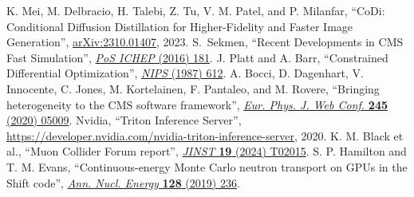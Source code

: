 \begin{thebibliography}{99}
 K. Mei, M. Delbracio, H. Talebi, Z. Tu, V. M. Patel, and P. Milanfar, ``CoDi: Conditional Diffusion Distillation for Higher-Fidelity and Faster Image Generation'', \href{https://arxiv.org/abs/2310.01407}{arXiv:2310.01407}, 2023.
 S.~Sekmen, ``Recent Developments in CMS Fast Simulation'', \href{https://doi.org/10.22323/1.282.0181}{\textit{PoS ICHEP} (2016) 181}.
 J. Platt and A. Barr, ``Constrained Differential Optimization'', \href{https://proceedings.neurips.cc/paper/1987/hash/a87ff679a2f3e71d9181a67b7542122c-Abstract.html}{\textit{NIPS} (1987) 612}.
 A. Bocci, D. Dagenhart, V. Innocente, C. Jones, M. Kortelainen, F. Pantaleo, and M. Rovere, ``Bringing heterogeneity to the CMS software framework'', \href{https://doi.org/10.1051/epjconf/202024505009}{\textit{Eur. Phys. J. Web Conf.} \textbf{245} (2020) 05009}.
 Nvidia, ``Triton Inference Server'', \href{https://developer.nvidia.com/nvidia-triton-inference-server}{https://developer.nvidia.com/nvidia-triton-inference-server}, 2020.
 K. M. Black et al., ``Muon Collider Forum report'', \href{https://doi.org/10.1088/1748-0221/19/02/T02015}{\textit{JINST} \textbf{19} (2024) T02015}.
 S. P. Hamilton and T. M. Evans, ``Continuous-energy Monte Carlo neutron transport on GPUs in the Shift code'', \href{https://doi.org/10.1016/j.anucene.2019.01.012}{\textit{Ann. Nucl. Energy} \textbf{128} (2019) 236}.
\end{thebibliography}
